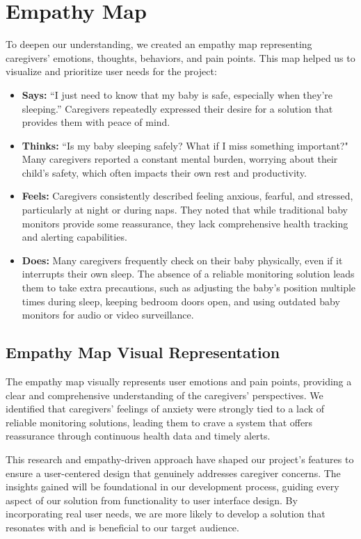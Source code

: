 \documentclass[12pt,a4paper]{report}
\begin{document}
\section{Empathy Map}
To deepen our understanding, we created an empathy map representing caregivers' emotions, thoughts, behaviors, and pain points. This map helped us to visualize and prioritize user needs for the project:
\begin{itemize}
  \item \textbf{Says:} ``I just need to know that my baby is safe, especially when they’re sleeping.” Caregivers repeatedly expressed their desire for a solution that provides them with peace of mind.

 \item \textbf{Thinks:} ``Is my baby sleeping safely? What if I miss something important?" Many caregivers reported a constant mental burden, worrying about their child’s safety, which often impacts their own rest and productivity.
  
  \item \textbf{Feels:} Caregivers consistently described feeling anxious, fearful, and stressed, particularly at night or during naps. They noted that while traditional baby monitors provide some reassurance, they lack comprehensive health tracking and alerting capabilities.
  
  \item \textbf{Does:} Many caregivers frequently check on their baby physically, even if it interrupts their own sleep. The absence of a reliable monitoring solution leads them to take extra precautions, such as adjusting the baby's position multiple times during sleep, keeping bedroom doors open, and using outdated baby monitors for audio or video surveillance.
\end{itemize}
\subsection{Empathy Map Visual Representation}
The empathy map visually represents user emotions and pain points, providing a clear and comprehensive understanding of the caregivers’ perspectives. We identified that caregivers' feelings of anxiety were strongly tied to a lack of reliable monitoring solutions, leading them to crave a system that offers reassurance through continuous health data and timely alerts.

This research and empathy-driven approach have shaped our project’s features to ensure a user-centered design that genuinely addresses caregiver concerns. The insights gained will be foundational in our development process, guiding every aspect of our solution from functionality to user interface design. By incorporating real user needs, we are more likely to develop a solution that resonates with and is beneficial to our target audience.
\end{document}

